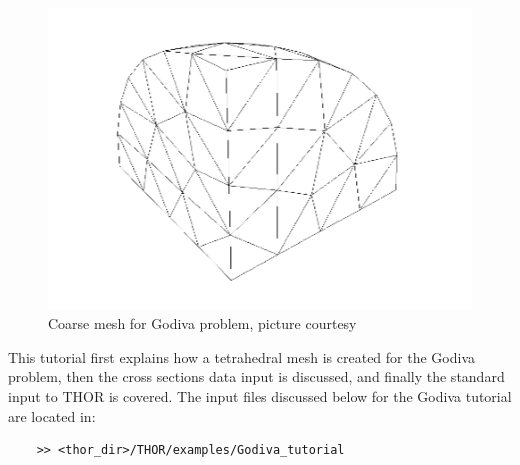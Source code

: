 \begin{figure}[th]
  \includegraphics[width=1.0\textwidth]{chapters/tutorials/figures/godiva_coarse.png}
  \caption{Coarse mesh for Godiva problem, picture courtesy~\cite{FerrerPhD}}
  \label{fig:godiva_coarse}
\end{figure}

This tutorial first explains how a tetrahedral mesh is created for the Godiva problem, then the cross sections data input is discussed, and finally the standard input to THOR is covered.
The input files discussed below for the Godiva tutorial are located in:
\begin{verbatim}
    >> <thor_dir>/THOR/examples/Godiva_tutorial
\end{verbatim}

